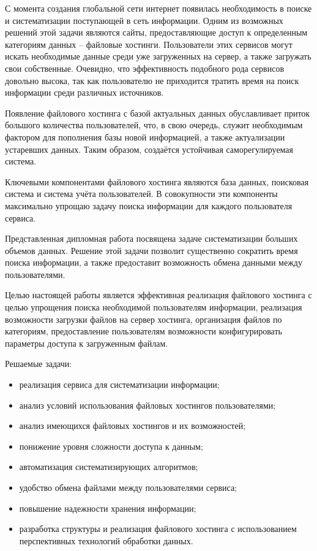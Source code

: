 \label{sec_introduce}
С момента создания глобальной сети интернет появилась необходимость в поиске и систематизации поступающей в сеть информации. Одним из возможных решений этой задачи являются сайты, предоставляющие доступ к определенным категориям данных – файловые хостинги. Пользователи этих сервисов могут искать необходимые данные среди уже загруженных на сервер, а также загружать свои собственные. Очевидно, что эффективность подобного рода сервисов довольно высока, так как пользователю не приходится тратить время на поиск информации среди различных источников. 

Появление файлового хостинга с базой актуальных данных обуславливает приток большого количества пользователей, что, в свою очередь, служит необходимым фактором для пополнения базы новой информацией, а также актуализации устаревших данных. Таким образом, создаётся устойчивая саморегулируемая система.

Ключевыми компонентами файлового хостинга являются база данных, поисковая система и система учёта пользователей. В совокупности эти компоненты максимально упрощаю задачу поиска информации для каждого пользователя сервиса.

Представленная дипломная работа посвящена задаче систематизации больших объемов данных. Решение этой задачи позволит существенно сократить время поиска информации, а также предоставит возможность обмена данными между пользователями.

Целью настоящей работы является эффективная реализация файлового хостинга с целью упрощения поиска необходимой пользователям информации, реализация возможности загрузки файлов на сервер хостинга, организация файлов по категориям, предоставление пользователям возможности конфигурировать параметры доступа к загруженным файлам.

Решаемые задачи:
\begin{itemize}
  \item реализация сервиса для систематизации информации;
  \item анализ условий использования файловых хостингов пользователями;
  \item анализ имеющихся файловых хостингов и их возможностей;
  \item понижение уровня сложности доступа к данным;
  \item автоматизация систематизирующих алгоритмов;
  \item удобство обмена файлами между пользователями сервиса;
  \item повышение надежности хранения информации;
  \item разработка структуры и реализация файлового хостинга с использованием перспективных технологий обработки данных.
\end{itemize}

